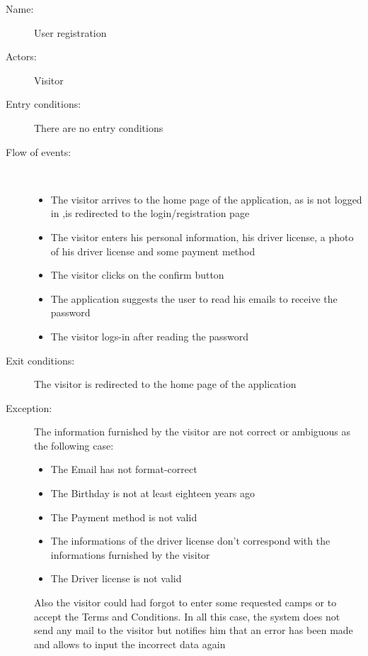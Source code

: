\begin{description}
	\item[Name:] User registration
	\item[Actors:] Visitor
	\item[Entry conditions:] There are no entry conditions
	\item[Flow of events:]  \ \\
		\begin{itemize}
			\item The visitor arrives to the home page of the application, as is not logged in ,is redirected to the login/registration page
			\item The visitor enters his personal information, his driver license, a photo of his driver license and some payment method
			\item The visitor clicks on the confirm button
			\item The application suggests the user to read his emails to receive the password
			\item The visitor logs-in after reading the password
		\end{itemize}
	\item[Exit conditions:] The visitor is redirected to the home page of the application
	\item [Exception:] The information furnished by the visitor are not correct or ambiguous as the following case:
		\begin{itemize}
			\item The Email has not format-correct
			\item The Birthday is not at least eighteen years ago
			\item The Payment method is not valid
			\item The informations of the driver license don't correspond with the informations furnished by the visitor
			\item The Driver license is not valid
		\end {itemize}
		Also the visitor could had forgot to enter some requested camps or to accept the Terms and Conditions. In all this case, the system does not send any mail to the visitor but notifies him that an error has been made and allows to input the incorrect data again
	\end{description}

